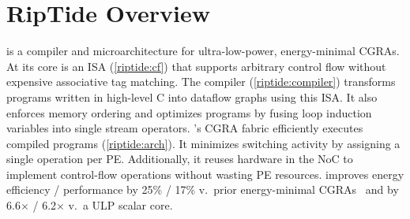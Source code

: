 \section{RipTide Overview}
\label{riptide:overview}


\riptide is a compiler and microarchitecture for ultra-low-power, energy-minimal CGRAs.
%
At its core is an ISA (\autoref{riptide:cf}) that supports arbitrary control flow without expensive associative tag matching.
% 
The compiler (\autoref{riptide:compiler}) transforms programs written in high-level C into dataflow graphs using this ISA.
% 
It also enforces memory ordering and optimizes programs by fusing loop induction variables into single stream operators.
% 
\riptide's CGRA fabric efficiently executes compiled programs (\autoref{riptide:arch}).
% 
It minimizes switching activity by assigning a single operation per PE.
% 
Additionally, it reuses hardware in the NoC to implement control-flow operations without wasting PE resources.
% 
\riptide improves energy efficiency / performance
by 25\% / 17\% v.\ prior
energy-minimal CGRAs~\cite{snafu} and by 6.6$\times$ / 6.2$\times$
v.\ a ULP scalar core.

% 
% 
% 

%
%
% 

